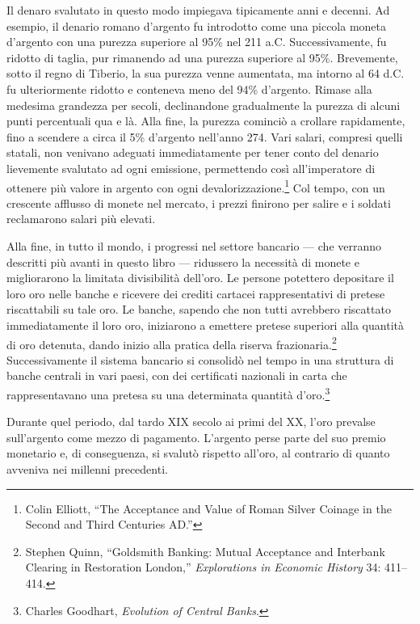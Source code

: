 \documentclass[
  a5paper,
  smalldemyvopaper,10pt,twoside,onecolumn,openright,extrafontsizes,hidelinks]{memoir}
\begin{document}
Il denaro svalutato in questo modo impiegava tipicamente anni e decenni.
Ad esempio, il denario romano d'argento fu introdotto come una piccola
moneta d'argento con una purezza superiore al 95\% nel 211 a.C.
Successivamente, fu ridotto di taglia, pur rimanendo ad una purezza
superiore al 95\%. Brevemente, sotto il regno di Tiberio, la sua purezza
venne aumentata, ma intorno al 64 d.C. fu ulteriormente ridotto e
conteneva meno del 94\% d'argento. Rimase alla medesima grandezza per
secoli, declinandone gradualmente la purezza di alcuni punti percentuali
qua e là. Alla fine, la purezza cominciò a crollare rapidamente, fino a
scendere a circa il 5\% d'argento nell'anno 274. Vari salari, compresi
quelli statali, non venivano adeguati immediatamente per tener conto del
denario lievemente svalutato ad ogni emissione, permettendo così
all'imperatore di ottenere più valore in argento con ogni
devalorizzazione.\footnote{Colin Elliott, ``The Acceptance and Value of
  Roman Silver Coinage in the Second and Third Centuries AD.''} Col
tempo, con un crescente afflusso di monete nel mercato, i prezzi
finirono per salire e i soldati reclamarono salari più elevati.

Alla fine, in tutto il mondo, i progressi nel settore bancario --- che
verranno descritti più avanti in questo libro --- ridussero la necessità
di monete e migliorarono la limitata divisibilità dell'oro. Le persone
potettero depositare il loro oro nelle banche e ricevere dei crediti
cartacei rappresentativi di pretese riscattabili su tale oro. Le banche,
sapendo che non tutti avrebbero riscattato immediatamente il loro oro,
iniziarono a emettere pretese superiori alla quantità di oro detenuta,
dando inizio alla pratica della riserva frazionaria.\footnote{Stephen
  Quinn, ``Goldsmith Banking: Mutual Acceptance and Interbank Clearing
  in Restoration London,'' \emph{Explorations in Economic History} 34:
  411--414.} Successivamente il sistema bancario si consolidò nel tempo
in una struttura di banche centrali in vari paesi, con dei certificati
nazionali in carta che rappresentavano una pretesa su una determinata
quantità d'oro.\footnote{Charles Goodhart, \emph{Evolution of Central
  Banks}.}

Durante quel periodo, dal tardo XIX secolo ai primi del XX, l'oro
prevalse sull'argento come mezzo di pagamento. L'argento perse parte del
suo premio monetario e, di conseguenza, si svalutò rispetto all'oro, al
contrario di quanto avveniva nei millenni precedenti.
\end{document}
